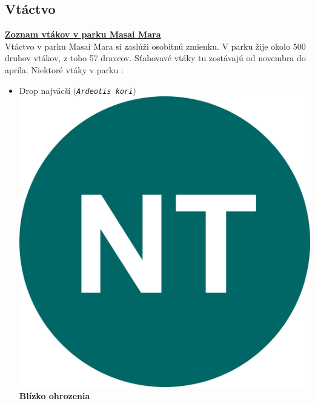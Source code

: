 \documentclass{article}
\begin{document}
	\subsection{Vtáctvo}
\label{subsec:brdng}
\href{https://raw.githubusercontent.com/jenca-adam/masai-mara-birding/master/vtactvo.txt}{\textbf{Zoznam vtákov v parku Masai Mara}}\\ 
Vtáctvo v parku Masai Mara si zaslúži osobitnú zmienku. V parku žije okolo 500 druhov vtákov, z toho 57 dravcov. 
Sťahovavé vtáky tu zostávajú od novembra do apríla.
Niektoré vtáky v parku :\\
\begin{itemize}
\item Drop najväcší $($\texttt{\textit{Ardeotis kori}}$)$\includegraphics[scale=0.015]{NT.png}{\color{ForestGreen}\textbf{Blízko ohrozenia}}


\end{itemize}
\end{document}
